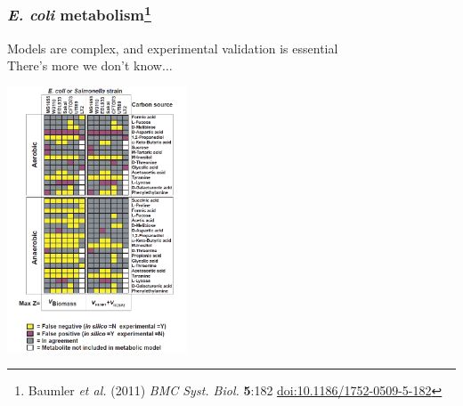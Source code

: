 \begin{frame}
  \frametitle{\textit{E. coli} metabolism\footnote{\tiny{Baumler \textit{et al.} (2011) \textit{BMC Syst. Biol.} \textbf{5}:182 \href{http://dx.doi.org/10.1186/1752-0509-5-182}{doi:10.1186/1752-0509-5-182}}}}
  Models are complex, and experimental validation is essential\\
  There's more we don't know$\ldots$
  \begin{center}
      \includegraphics[width=0.4\textwidth]{images/e_coli_carbon_source} 
  \end{center}
\end{frame}